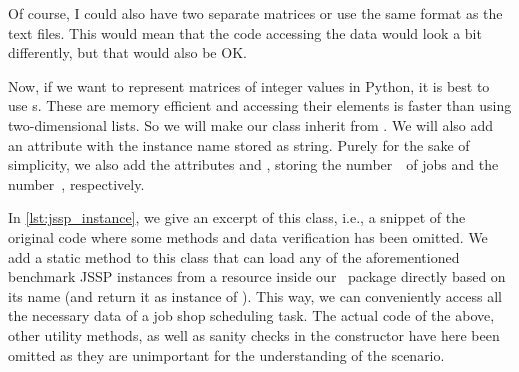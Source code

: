 Of course, I could also have two separate matrices or use the same format as the text files.
This would mean that the code accessing the data would look a bit differently, but that would also be OK.

Now, if we want to represent matrices of integer values in Python, it is best to use {\numpyndarray}s.
These are memory efficient and accessing their elements is faster than using two-dimensional lists.
So we will make our class inherit from \numpyndarray.
We will also add an attribute  with the instance name stored as string.
Purely for the sake of simplicity, we also add the attributes  and , storing the number~\jsspJobs\ of jobs and the number~\jsspMachines, respectively.


In \autoref{lst:jssp_instance}, we give an excerpt of this class, i.e., a snippet of the original code where some methods and data verification has been omitted.
We add a static method  to this class that can load any of the aforementioned benchmark \gls{JSSP} instances from a resource inside our \moptipy\ package directly based on its name (and return it as instance of ).
This way, we can conveniently access all the necessary data of a job shop scheduling task.
The actual code of the above, other utility methods, as well as sanity checks in the  constructor have here been omitted as they are unimportant for the understanding of the scenario.%
\endhsection%
\endhsection%
%

